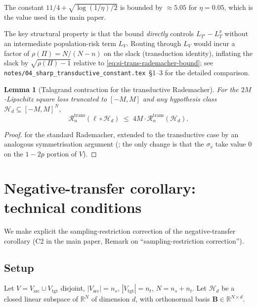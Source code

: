 \documentclass[11pt,a4paper]{article}
\theoremstyle{plain}
\newtheorem{lemma}[theorem]{Lemma}
\theoremstyle{definition}
\theoremstyle{remark}
\newcommand{\bB}{\mathbf{B}}
\newcommand{\R}{\mathbb{R}}
\newcommand{\Hcal}{\mathcal{H}}
\begin{document}
The constant $11/4 + \sqrt{\log(1/\eta)/2}$ is bounded by $\approx 5.05$
for $\eta = 0.05$, which is the value used in the main paper.

The key structural property is that the bound \emph{directly}
controls $L_{T^c} - L_T^\pi$ without an intermediate population-risk
term $L_V$.  Routing through $L_V$ would incur a factor of $\rho(\Pi)
= N/(N-n)$ on the slack (transduction identity), inflating the slack
by $\sqrt{\rho(\Pi) - 1}$ relative to
\eqref{eq:si-trans-rademacher-bound}; see
\texttt{notes/04\_sharp\_transductive\_constant.tex}~\S 1--3 for the
detailed comparison.

\begin{lemma}[Talagrand contraction for the transductive Rademacher]
\label{lem:si-talagrand-trans}
For the $2M$-Lipschitz square loss truncated to $[-M, M]$ and any
hypothesis class $\Hcal_d \subseteq [-M, M]^N$,
\begin{equation*}
    \mathcal{R}_n^{\mathrm{trans}}(\ell \circ \Hcal_d) \;\leq\; 4 M \cdot \mathcal{R}_n^{\mathrm{trans}}(\Hcal_d).
\end{equation*}
\end{lemma}

\begin{proof}
\citet[][\S 4.2]{Talagrand1996concentration} for the standard Rademacher,
extended to the transductive case by an analogous symmetrisation
argument
(\citealp[][\S 5]{ElYanivPechyony2006}; the only change is that the
$\sigma_v$ take value $0$ on the $1 - 2p$ portion of $V$).
\end{proof}

\section{Negative-transfer corollary: technical conditions}
\label{sec:si-C}

We make explicit the sampling-restriction correction of the negative-transfer
corollary (C2 in the main paper, Remark on
``sampling-restriction correction'').

\subsection{Setup}

Let $V = V_{\mathrm{src}} \cup V_{\mathrm{tgt}}$ disjoint, $|V_{\mathrm{src}}| =
n_s$, $|V_{\mathrm{tgt}}| = n_t$, $N = n_s + n_t$.  Let $\Hcal_d$ be a
closed linear subspace of $\R^N$ of dimension $d$, with orthonormal
basis $\bB \in \R^{N \times d}$.
\end{document}
